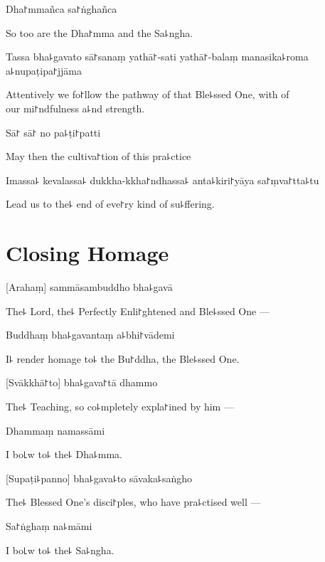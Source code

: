 Dha꜓mmañca sa꜓ṅghañca

\begin{english}
  So too are the Dha꜓mma and the Sa꜕ngha.
\end{english}

Tassa bha꜕gavato sā꜓sanaṃ yathā꜓-sati yathā꜓-balaṃ manasika꜕roma a꜕nupaṭipa꜓jjāma

\begin{english}
  Attentively we fo꜓llow the pathway of that Ble꜕ssed One, with  of \\our mi꜓ndfulness a꜕nd strength.
\end{english}

Sā꜓ sā꜓ no pa꜕ṭi꜓patti

\begin{english}
  May then the cultiva꜓tion of this pra꜕ctice
\end{english}

Imassa꜕ kevalassa꜕ dukkha-kkha꜓ndhassa꜕ anta꜕kiri꜓yāya sa꜓ṃva꜓tta꜕tu

\begin{english}
  Lead us to the꜕ end of eve꜓ry kind of su꜕ffering.
\end{english}

\clearpage

\chapter{Closing Homage}                            %

[Arahaṃ] sammāsambuddho bha꜕gavā

\begin{english}
  The꜕ Lord, the꜕ Perfectly Enli꜓ghtened and Ble꜕ssed One ---
\end{english}

Buddhaṃ bha꜕gavantaṃ a꜕bhi꜓vādemi

\begin{english}
  I꜕ render homage to꜕ the Bu꜓ddha, the Ble꜕ssed One.
\end{english}

[Svākkhā꜓to] bha꜕gava꜓tā dhammo

\begin{english}
  The꜕ Teaching, so co꜕mpletely expla꜓ined by him ---
\end{english}

Dhammaṃ namassāmi

\begin{english}
  I bo꜖w to꜕ the꜕ Dha꜕mma.
\end{english}


[Supaṭi꜕panno] bha꜕gava꜕to sāvaka꜕saṅgho

\begin{english}
  The꜕ Blessed One's disci꜓ples, who have pra꜕ctised well ---
\end{english}

Sa꜓ṅghaṃ na꜕māmi

\begin{english}
  I bo꜖w to꜕ the꜕ Sa꜕ngha.
\end{english}


